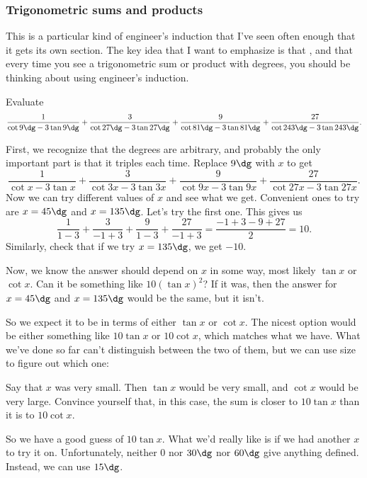 \documentclass[11pt,paper=letter]{scrartcl}
\begin{document}
\subsubsection{Trigonometric sums and products}

This is a particular kind of engineer's induction that I've seen often enough that it gets its own section. The key idea that I want to emphasize is that , and that every time you see a trigonometric sum or product with degrees, you should be thinking about using engineer's induction.

\begin{exboxed}[Titu]
  Evaluate
  \[
  \frac{1}{\cot 9\dg - 3 \tan 9\dg} + \frac{3}{\cot 27\dg - 3\tan 27\dg} + \frac{9}{\cot 81\dg - 3 \tan 81\dg} + \frac{27}{\cot 243\dg - 3\tan 243\dg}.
  \]
\end{exboxed}

First, we recognize that the degrees are arbitrary, and probably the only important part is that it triples each time. Replace $9\dg$ with $x$ to get
\[
\frac{1}{\cot x - 3 \tan x} + \frac{3}{\cot 3x - 3\tan 3x} + \frac{9}{\cot 9x - 3 \tan 9x} + \frac{27}{\cot 27x - 3\tan 27x}.
\]
Now we can try different values of $x$ and see what we get. Convenient ones to try are $x = 45\dg$ and $x = 135\dg$. Let's try the first one. This gives us
\[
\frac{1}{1 - 3} + \frac{3}{-1 + 3} + \frac{9}{1 - 3} + \frac{27}{-1 + 3} = \frac{-1 + 3 - 9 + 27}{2} = 10.
\]
Similarly, check that if we try $x = 135\dg$, we get $-10$.

Now, we know the answer should depend on $x$ in some way, most likely $\tan x$ or $\cot x$. Can it be something like $10\left(\tan x\right)^2$? If it was, then the answer for $x = 45\dg$ and $x = 135\dg$ would be the same, but it isn't.

So we expect it to be in terms of either $\tan x$ or $\cot x$. The nicest option would be either something like $10 \tan x$ or $10 \cot x$, which matches what we have. What we've done so far can't distinguish between the two of them, but we can use size to figure out which one:

\begin{exrboxed}
  Say that $x$ was very small. Then $\tan x$ would be very small, and $\cot x$ would be very large. Convince yourself that, in this case, the sum is closer to $10 \tan x$ than it is to $10 \cot x$.
\end{exrboxed}

So we have a good guess of $10 \tan x$. What we'd really like is if we had another $x$ to try it on. Unfortunately, neither $0$ nor $30\dg$ nor $60\dg$ give anything defined. Instead, we can use $15\dg$.
\end{document}
